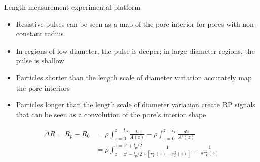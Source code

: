 \begin{frame}[c]{Length measurement experimental platform}
	\begin{itemize}
		\item Resistive pulses can be seen as a map of the pore interior for pores with non-constant radius
		\item In regions of low diameter, the pulse is deeper; in large diameter regions, the pulse is shallow
		\item Particles shorter than the length scale of diameter variation accurately map the pore interiors
		\item Particles longer than the length scale of diameter variation create RP signals that can be seen as a convolution of the pore's interior shape
	\end{itemize}
	
	\begin{equation}
		\begin{split}
			 \Delta R = R_{p}-R_{0} &= \rho\int_{z=0}^{z=l_{P}}\frac{dz}{A\left(z\right)}-\rho\int_{z=0}^{z=l_{P}}\frac{dz}{A'\left(z\right)} \\ 
			 &= \rho\int_{z=z'-l_{p}/2}^{z=z'+l_{p}/2}\frac{1}{\pi\left[r_{P}^{2}\left(z\right)-r_{p}^{2}\left(z\right)\right]}-\frac{1}{\pi r_{P}^{2}\left(z\right)}
		\end{split}
	\end{equation}

\end{frame}